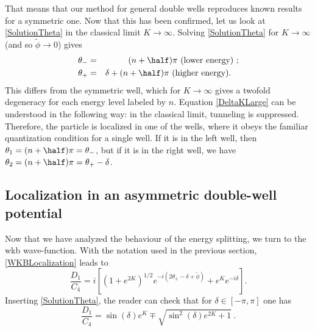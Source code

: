 \documentclass[12pt]{article}
\begin{document}
That means that  our method for general double wells  reproduces known results for a symmetric one.
Now that this has been confirmed, let us look at \eqref{SolutionTheta} in the classical limit $K\rightarrow \infty$.
Solving \eqref{SolutionTheta} for $K\rightarrow \infty$ (and so $\tilde{\phi}\rightarrow 0$) gives
\begin{eqnarray}
\theta_- &=& (n+\half)\pi \mbox {  (lower energy) };\\
\theta_+&=& \delta+(n+\half)\pi  \mbox {  (higher energy). \label{DeltaKLarge} }
\end{eqnarray}
This  differs from the symmetric well, which for $K\rightarrow \infty$ gives a twofold degeneracy for each energy level labeled by $n$. Equation \eqref{DeltaKLarge} can be understood in the following way: in the classical limit, tunneling is suppressed.
Therefore, the particle is localized in one of the wells, where it obeys the familiar quantization condition for a single well.
If it is in the left well, then $\theta_1=(n+\half)\pi=\theta_-$, but if it is in the right well, we have $\theta_2=(n+\half)\pi=\theta_+ -\delta$.
\subsection{Localization in an asymmetric double-well potential}
\label{LocWKB}
Now that we have analyzed the behaviour of the energy splitting, we turn to the {\sc wkb} wave-function.
With the notation used in the previous section, \eqref{WKBLocalization} leads to
\begin{equation}
\frac{D_1}{C_4} =i\left[\left(1+e^{2K}\right)^{1/2}e^{-i(2\theta_{\pm}-\delta+\tilde{\phi})}+e^Ke^{-i\delta}\right].
\end{equation}
Inserting \eqref{SolutionTheta}, the reader can check that for $\delta\in[-\pi,\pi]$ one has
\begin{equation}
\frac{D_1}{C_4} =\sin(\delta)e^{K} \mp \sqrt{\sin^2(\delta)e^{2K}+1}\ .
\label{D1/C4}
\end{equation}
\end{document}
